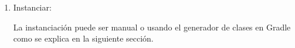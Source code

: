 \begin{enumerate}
	\item Instanciar:

	La instanciación puede ser manual o usando el generador de clases en Gradle como se explica en la siguiente sección.

\end{enumerate}	





